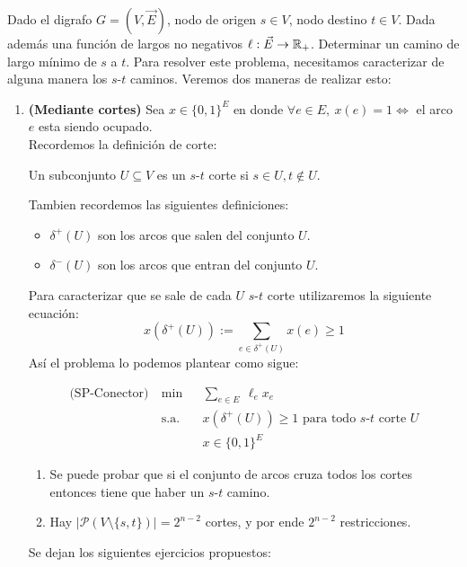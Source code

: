 \begin{eje} Dado el digrafo $G=(V,\Vec{E})$, nodo de origen $s \in V$, nodo destino $t \in V$. Dada además una función de largos no negativos $\ell: \Vec{E} \to \mathbb R_{+}$. Determinar un camino de largo mínimo de $s$ a $t$. Para resolver este problema, necesitamos caracterizar de alguna manera los $s$-$t$ caminos.  Veremos dos maneras de realizar esto:
\begin{enumerate}[\bf I.-]
    \item \textbf{(Mediante cortes)} Sea $x\in \{0,1\}^E$ en donde $\forall e\in E, ~x(e)=1 \iff$ el arco $e$ esta siendo ocupado.\\
    Recordemos la definición de corte:
    \begin{defi}[s-t corte] Un subconjunto $U \subseteq V$ es un $s$-$t$ corte si $s \in U, t \not \in U$. 
    \end{defi}
    Tambien recordemos las siguientes definiciones:
    \begin{defi}
    \hphantom{0.5 cm}
    \begin{itemize}
        \item $\delta^{+}(U)$ son los arcos que salen del conjunto $U$.
        \item $\delta^{-}(U)$ son los arcos que entran del conjunto $U$. 
    \end{itemize} 
    \end{defi}
    Para caracterizar que se sale de cada $U$ $s$-$t$ corte utilizaremos la siguiente ecuación:
    $$x(\delta^+(U)):= \sum\limits_{e\in \delta^+(U)} x(e) \geq 1 $$
    Así el problema lo podemos plantear como sigue:

\begin{equation*}
\begin{aligned}
\textrm{(SP-Conector)}~ & \min
& & \displaystyle{\sum_{e \in E}}~\ell_{e}x_{e}\\
& \text{s.a.}
& & x\left(\delta^{+}(U)\right) \geq 1 \text{ para todo }s\text{-}t \text{ corte } U \\
&&& x \in\{0,1\}^{E}
\end{aligned}
\end{equation*}


\begin{enumerate}
    \item Se puede probar que si el conjunto de arcos cruza todos los cortes entonces tiene que haber un $s$-$t$ camino.
    \item Hay $|\mathcal{P}(V\setminus\{s,t\})|=2^{n-2}$ cortes, y por ende $2^{n-2}$ restricciones.
\end{enumerate}
Se dejan los siguientes ejercicios propuestos:


\end{enumerate}
\end{eje}
